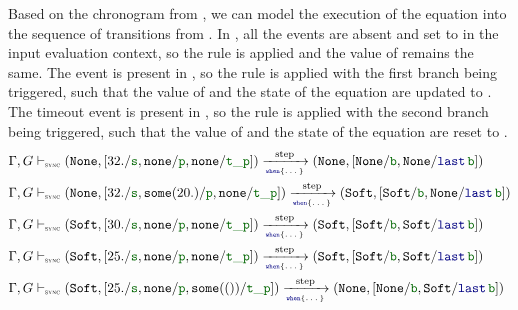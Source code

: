 Based on the chronogram from , we can model the execution
of the  equation into the sequence of transitions from
.
In , all the events are absent and set to \none in the input evaluation context, so the rule
 is applied and the value of 
remains the same. The event  is present in
, so the rule
 is applied with the first branch being
triggered, such that the value of  and the state of the  equation are updated to
\Soft. The timeout event  is present in
, so the rule
 is applied with the second branch being
triggered, such that the value of  and the state of the  equation are reset to \No.
\begin{align}
    \eqOpsem
    {[32. / \idf{s}, \none / \idf{p}, \none / \idf{t\_p}]}
    {\No   & }
    {\kwf{when} \{ \dots \}}
    {\No}
    {[\No / \idf{b}, \No / \last{\idf{b}}]}
    \label{eq:semantics:grsync:opsem:step:eq:when:ex:1} \\
    \eqOpsem
    {[32. / \idf{s}, \some{20.} / \idf{p}, \none / \idf{t\_p}]}
    {\No   & }
    {\kwf{when} \{ \dots \}}
    {\Soft}
    {[\Soft / \idf{b}, \No / \last{\idf{b}}]}
    \label{eq:semantics:grsync:opsem:step:eq:when:ex:2} \\
    \eqOpsem
    {[30. / \idf{s}, \none / \idf{p}, \none / \idf{t\_p}]}
    {\Soft & }
    {\kwf{when} \{ \dots \}}
    {\Soft}
    {[\Soft / \idf{b}, \Soft / \last{\idf{b}}]}
    \label{eq:semantics:grsync:opsem:step:eq:when:ex:3} \\
    \eqOpsem
    {[25. / \idf{s}, \none / \idf{p}, \none / \idf{t\_p}]}
    {\Soft & }
    {\kwf{when} \{ \dots \}}
    {\Soft}
    {[\Soft / \idf{b}, \Soft / \last{\idf{b}}]}
    \label{eq:semantics:grsync:opsem:step:eq:when:ex:4} \\
    \eqOpsem
    {[25. / \idf{s}, \none / \idf{p}, \some{()} / \idf{t\_p}]}
    {\Soft & }
    {\kwf{when} \{ \dots \}}
    {\No}
    {[\No / \idf{b}, \Soft / \last{\idf{b}}]}
    \label{eq:semantics:grsync:opsem:step:eq:when:ex:5}
\end{align}

